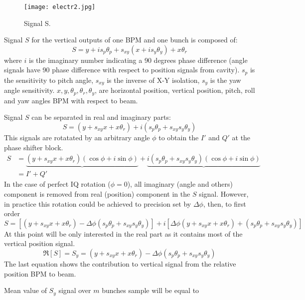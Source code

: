 \begin{figure}[htb]
 \begin{center}
  \texttt{[image: electr2.jpg]}\caption{Signal S.}\label{Ssignal}
 \end{center}
\end{figure}
Signal $S$ for the vertical outputs of one BPM and one bunch is composed of:
\begin{equation}
S = y+is_p\theta_p+s_{xy}(x+is_y\theta_y)+x\theta_r
\end{equation}
where $i$ is the imaginary number indicating a 90 degrees phase difference (angle signals have 90 phase difference with respect to position signals from cavity). $s_p$ is the sensitivity to pitch angle, $s_{xy}$ is the inverse of X-Y isolation, $s_y$ is the yaw angle sensitivity. $x,y,\theta_p,\theta_r,\theta_y$, are horizontal position, vertical position, pitch, roll and yaw angles BPM with respect to beam.\par
Signal $S$ can be separated in real and imaginary parts:
\begin{equation}
S = (y+s_{xy}x+x\theta_r)+i(s_p\theta_p+s_{xy}s_y\theta_y)
\end{equation}
This signals are rotatated by an arbitrary angle $\phi$ to obtain the $I'$ and $Q'$ at the phase shifter block.
\begin{align*}
S &= \underbrace{(y+s_{xy}x+x\theta_r)(\cos\phi+i\sin\phi)}+\underbrace{i(s_p\theta_p+s_{xy}s_y\theta_y)(\cos\phi+i\sin\phi)}\\
  &= I' + Q' 
\end{align*}
In the case of perfect IQ rotation ($\phi=0$), all imaginary (angle and others) component is removed from real (position) component in the $S$ signal. However, in practice this rotation could be achieved to precision set by $\Delta\phi$, then, to first order
\begin{equation}
S=[(y+s_{xy}x+x\theta_r)-\Delta\phi(s_p\theta_p+s_{xy}s_y\theta_y)]+i[\Delta\phi(y+s_{xy}x+x\theta_r)+(s_p\theta_p+s_{xy}s_y\theta_y)]
\end{equation}
At this point will be only interested in the real part as it contains most of the vertical position signal.
\begin{equation}
 \Re[S]=S_y = (y+s_{xy}x+x\theta_r)-\Delta\phi(s_p\theta_p+s_{xy}s_y\theta_y)
\end{equation}
The last equation shows the contribution to vertical signal from the relative position BPM to beam.\par
Mean value of $S_y$ signal over $m$ bunches sample will be equal to
